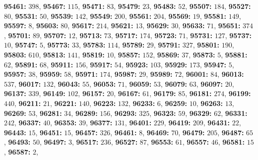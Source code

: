 \textsf{\bfseries 95461:} $398$, \textsf{\bfseries 95467:} $115$, \textsf{\bfseries 95471:} $83$, \textsf{\bfseries 95479:} $23$, \textsf{\bfseries 95483:} $52$, \textsf{\bfseries 95507:} $184$, \textsf{\bfseries 95527:} $80$, \textsf{\bfseries 95531:} $50$, \textsf{\bfseries 95539:} $142$, \textsf{\bfseries 95549:} $200$, \textsf{\bfseries 95561:} $204$, \textsf{\bfseries 95569:} $19$, \textsf{\bfseries 95581:} $149$, \textsf{\bfseries 95597:} $8$, \textsf{\bfseries 95603:} $80$, \textsf{\bfseries 95617:} $214$, \textsf{\bfseries 95621:} $13$, \textsf{\bfseries 95629:} $30$, \textsf{\bfseries 95633:} $71$, \textsf{\bfseries 95651:} $374$, \textsf{\bfseries 95701:} $89$, \textsf{\bfseries 95707:} $12$, \textsf{\bfseries 95713:} $73$, \textsf{\bfseries 95717:} $174$, \textsf{\bfseries 95723:} $71$, \textsf{\bfseries 95731:} $127$, \textsf{\bfseries 95737:} $10$, \textsf{\bfseries 95747:} $5$, \textsf{\bfseries 95773:} $33$, \textsf{\bfseries 95783:} $114$, \textsf{\bfseries 95789:} $29$, \textsf{\bfseries 95791:} $327$, \textsf{\bfseries 95801:} $190$, \textsf{\bfseries 95803:} $610$, \textsf{\bfseries 95813:} $141$, \textsf{\bfseries 95819:} $10$, \textsf{\bfseries 95857:} $152$, \textsf{\bfseries 95869:} $37$, \textsf{\bfseries 95873:} $5$, \textsf{\bfseries 95881:} $62$, \textsf{\bfseries 95891:} $68$, \textsf{\bfseries 95911:} $156$, \textsf{\bfseries 95917:} $54$, \textsf{\bfseries 95923:} $103$, \textsf{\bfseries 95929:} $173$, \textsf{\bfseries 95947:} $5$, \textsf{\bfseries 95957:} $38$, \textsf{\bfseries 95959:} $58$, \textsf{\bfseries 95971:} $174$, \textsf{\bfseries 95987:} $29$, \textsf{\bfseries 95989:} $72$, \textsf{\bfseries 96001:} $84$, \textsf{\bfseries 96013:} $537$, \textsf{\bfseries 96017:} $132$, \textsf{\bfseries 96043:} $55$, \textsf{\bfseries 96053:} $71$, \textsf{\bfseries 96059:} $53$, \textsf{\bfseries 96079:} $63$, \textsf{\bfseries 96097:} $20$, \textsf{\bfseries 96137:} $339$, \textsf{\bfseries 96149:} $102$, \textsf{\bfseries 96157:} $20$, \textsf{\bfseries 96167:} $61$, \textsf{\bfseries 96179:} $85$, \textsf{\bfseries 96181:} $274$, \textsf{\bfseries 96199:} $440$, \textsf{\bfseries 96211:} $21$, \textsf{\bfseries 96221:} $140$, \textsf{\bfseries 96223:} $132$, \textsf{\bfseries 96233:} $6$, \textsf{\bfseries 96259:} $10$, \textsf{\bfseries 96263:} $13$, \textsf{\bfseries 96269:} $53$, \textsf{\bfseries 96281:} $34$, \textsf{\bfseries 96289:} $156$, \textsf{\bfseries 96293:} $325$, \textsf{\bfseries 96323:} $59$, \textsf{\bfseries 96329:} $62$, \textsf{\bfseries 96331:} $242$, \textsf{\bfseries 96337:} $40$, \textsf{\bfseries 96353:} $39$, \textsf{\bfseries 96377:} $131$, \textsf{\bfseries 96401:} $229$, \textsf{\bfseries 96419:} $209$, \textsf{\bfseries 96431:} $22$, \textsf{\bfseries 96443:} $15$, \textsf{\bfseries 96451:} $15$, \textsf{\bfseries 96457:} $326$, \textsf{\bfseries 96461:} $8$, \textsf{\bfseries 96469:} $70$, \textsf{\bfseries 96479:} $205$, \textsf{\bfseries 96487:} $65$, \textsf{\bfseries 96493:} $50$, \textsf{\bfseries 96497:} $3$, \textsf{\bfseries 96517:} $236$, \textsf{\bfseries 96527:} $87$, \textsf{\bfseries 96553:} $61$, \textsf{\bfseries 96557:} $46$, \textsf{\bfseries 96581:} $15$, \textsf{\bfseries 96587:} $2$, 
